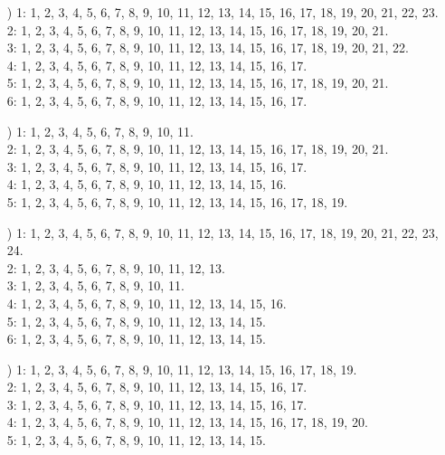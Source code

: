 \documentclass[a4paper,11pt]{article}
\numberwithin{equation}{section}
\begin{document}
\begin{itemize}
\item[\romannumeral4)] 1: 1, 2, 3, 4, 5, 6, 7, 8, 9, 10, 11, 12, 13, 14, 15,
  16, 17, 18, 19, 20, 21, 22, 23. \\
  2: 1, 2, 3, 4, 5, 6, 7, 8, 9, 10, 11, 12, 13, 14, 15, 16, 17, 18, 19, 20,
  21. \\
  3: 1, 2, 3, 4, 5, 6, 7, 8, 9, 10, 11, 12, 13, 14, 15, 16, 17, 18, 19, 20,
  21, 22. \\
  4: 1, 2, 3, 4, 5, 6, 7, 8, 9, 10, 11, 12, 13, 14, 15, 16, 17. \\
  5: 1, 2, 3, 4, 5, 6, 7, 8, 9, 10, 11, 12, 13, 14, 15, 16, 17, 18, 19, 20,
  21. \\
  6: 1, 2, 3, 4, 5, 6, 7, 8, 9, 10, 11, 12, 13, 14, 15, 16, 17.

\item[\romannumeral5)] 1: 1, 2, 3, 4, 5, 6, 7, 8, 9, 10, 11. \\
  2: 1, 2, 3, 4, 5, 6, 7, 8, 9, 10, 11, 12, 13, 14, 15, 16, 17, 18, 19, 20,
  21. \\
  3: 1, 2, 3, 4, 5, 6, 7, 8, 9, 10, 11, 12, 13, 14, 15, 16, 17. \\
  4: 1, 2, 3, 4, 5, 6, 7, 8, 9, 10, 11, 12, 13, 14, 15, 16. \\
  5: 1, 2, 3, 4, 5, 6, 7, 8, 9, 10, 11, 12, 13, 14, 15, 16, 17, 18, 19.

\item[\romannumeral6)] 1: 1, 2, 3, 4, 5, 6, 7, 8, 9, 10, 11, 12, 13, 14, 15,
  16, 17, 18, 19, 20, 21, 22, 23, 24. \\
  2: 1, 2, 3, 4, 5, 6, 7, 8, 9, 10, 11, 12, 13. \\
  3: 1, 2, 3, 4, 5, 6, 7, 8, 9, 10, 11. \\
  4: 1, 2, 3, 4, 5, 6, 7, 8, 9, 10, 11, 12, 13, 14, 15, 16. \\
  5: 1, 2, 3, 4, 5, 6, 7, 8, 9, 10, 11, 12, 13, 14, 15. \\
  6: 1, 2, 3, 4, 5, 6, 7, 8, 9, 10, 11, 12, 13, 14, 15.

\item[\romannumeral7)] 1: 1, 2, 3, 4, 5, 6, 7, 8, 9, 10, 11, 12, 13, 14, 15,
  16, 17, 18, 19. \\
  2: 1, 2, 3, 4, 5, 6, 7, 8, 9, 10, 11, 12, 13, 14, 15, 16, 17. \\
  3: 1, 2, 3, 4, 5, 6, 7, 8, 9, 10, 11, 12, 13, 14, 15, 16, 17. \\
  4: 1, 2, 3, 4, 5, 6, 7, 8, 9, 10, 11, 12, 13, 14, 15, 16, 17, 18, 19,
  20. \\
  5: 1, 2, 3, 4, 5, 6, 7, 8, 9, 10, 11, 12, 13, 14, 15.


\end{itemize}
\end{document}

